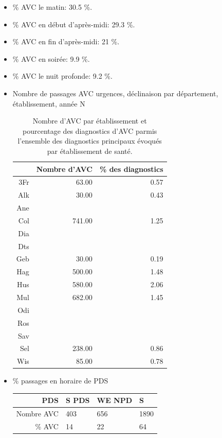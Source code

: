 \documentclass[]{article}
\begin{document}
\begin{itemize}
\item
  \% AVC le matin: 30.5 \%.
\item
  \% AVC en début d'après-midi: 29.3 \%.
\item
  \% AVC en fin d'après-midi: 21 \%.
\item
  \% AVC en soirée: 9.9 \%.
\item
  \% AVC le nuit profonde: 9.2 \%.
\item
  Nombre de passages AVC urgences, déclinaison par département,
  établissement, année N

  \begin{table}[ht]
  \centering
  \begin{tabular}{rrr}
    \hline
   & Nombre d'AVC & \% des diagnostics \\ 
    \hline
  3Fr & 63.00 & 0.57 \\ 
    Alk & 30.00 & 0.43 \\ 
    Ane &  &  \\ 
    Col & 741.00 & 1.25 \\ 
    Dia &  &  \\ 
    Dts &  &  \\ 
    Geb & 30.00 & 0.19 \\ 
    Hag & 500.00 & 1.48 \\ 
    Hus & 580.00 & 2.06 \\ 
    Mul & 682.00 & 1.45 \\ 
    Odi &  &  \\ 
    Ros &  &  \\ 
    Sav &  &  \\ 
    Sel & 238.00 & 0.86 \\ 
    Wis & 85.00 & 0.78 \\ 
     \hline
  \end{tabular}
  \caption{Nombre d'AVC par établissement et pourcentage des diagnostics d'AVC parmis l'ensemble des diagnostics principaux évoqués par établissement de santé.} 
  \label{avcParES}
  \end{table}
\item
  \% passages en horaire de PDS

  \begin{longtable}[c]{@{}rlll@{}}
  \toprule
  PDS & S PDS & WE NPD & S\tabularnewline
  \midrule
  \endhead
  Nombre AVC & 403 & 656 & 1890\tabularnewline
  \% AVC & 14 & 22 & 64\tabularnewline
  \bottomrule
  \end{longtable}
\end{itemize}
\end{document}
